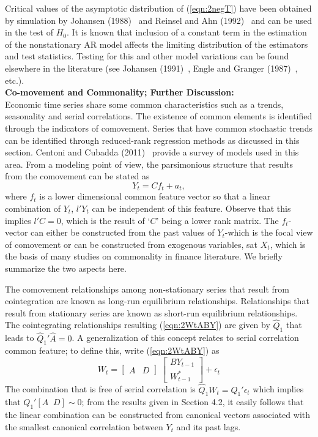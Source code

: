 Critical values of the asymptotic distribution of (\ref{eqn:2negT}) have been obtained by simulation by Johansen (1988)~\cite{johansen1988statistical} and Reinsel and Ahn (1992)~\cite{reinsel1992vector} and can be used in the test of $H_0$. It is known that inclusion of a constant term in the estimation of the nonstationary AR model affects the limiting distribution of the estimators and test statistics. Testing for this and other model variations can be found elsewhere in the literature (see Johansen (1991)~\cite{johansen1991estimation}, Engle and Granger (1987)~\cite{engle1987co}, etc.). \\


\noindent \textbf{Co-movement and Commonality; Further Discussion:} \\


Economic time series share some common characteristics such as a trends, seasonality and serial correlations. The existence of common elements is identified through the indicators of comovement. Series that have common stochastic trends can be identified through reduced-rank regression methods as discussed in this section. Centoni and Cubadda (2011)~\cite{centoni} provide a survey of models used in this area. From a modeling point of view, the parsimonious structure that results from the comovement can be stated as
	\begin{equation}\label{eqn:discyt}
	Y_t= Cf_t + a_t,
	\end{equation}  
where $f_t$ is a lower dimensional common feature vector so that a linear combination of $Y_t$, $l' Y_t$ can be independent of this feature. Observe that this implies $l'C=0$, which is the result of `$C$' being a lower rank matrix. The $f_t$-vector can either be constructed from the past values of $Y_t$-which is the focal view of comovement or can be constructed from exogenous variables, sat $X_t$, which is the basis of many studies on commonality in finance literature. We briefly summarize the two aspects here. 


The comovement relationships among non-stationary series that result from cointegration are known as long-run equilibrium relationships. Relationships that result from stationary series are known as short-run equilibrium relationships. The cointegrating relationships resulting  (\ref{eqn:2WtABY}) are given by $\hat{Q}_1$ that leads to $\hat{Q}_1' \hat{A}=0$. A generalization of this concept relates to serial correlation common feature; to define this, write (\ref{eqn:2WtABY}) as
	\begin{equation}\label{eqn:wtrewrite}
	W_t=  \begin{bmatrix} A & D \end{bmatrix} \; \begin{bmatrix} BY_{t-1} \\ W_{t-1}^* \end{bmatrix} + \epsilon_t
	\end{equation}
The combination that is free of serial correlation is $\hat{Q}_1W_t= Q_1' \epsilon_t$ which implies that $Q_1' [A \;\; D] \sim 0$; from the results given in Section 4.2, it easily follows that the linear combination can be constructed from canonical vectors associated with the smallest canonical correlation between $Y_t$ and its past lags.


